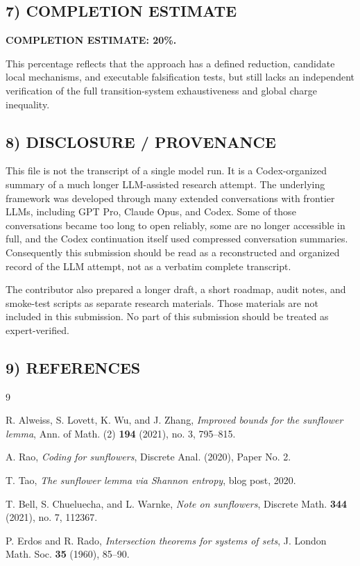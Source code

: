 \subsection{7) COMPLETION ESTIMATE}

\textbf{COMPLETION ESTIMATE: 20\%.}

This percentage reflects that the approach has a defined reduction, candidate
local mechanisms, and executable falsification tests, but still lacks an
independent verification of the full transition-system exhaustiveness and
global charge inequality.

\subsection{8) DISCLOSURE / PROVENANCE}

This file is not the transcript of a single model run.  It is a Codex-organized
summary of a much longer LLM-assisted research attempt.  The underlying
framework was developed through many extended conversations with frontier LLMs,
including GPT Pro, Claude Opus, and Codex.  Some of those conversations became
too long to open reliably, some are no longer accessible in full, and the Codex
continuation itself used compressed conversation summaries.  Consequently this
submission should be read as a reconstructed and organized record of the LLM
attempt, not as a verbatim complete transcript.

The contributor also prepared a longer draft, a short roadmap, audit notes,
and smoke-test scripts as separate research materials.  Those materials are
not included in this submission.  No part of this submission should be treated
as expert-verified.

\subsection{9) REFERENCES}

\begin{thebibliography}{9}

R. Alweiss, S. Lovett, K. Wu, and J. Zhang,
\emph{Improved bounds for the sunflower lemma},
Ann. of Math. (2) \textbf{194} (2021), no. 3, 795--815.

A. Rao,
\emph{Coding for sunflowers},
Discrete Anal. (2020), Paper No. 2.

T. Tao,
\emph{The sunflower lemma via Shannon entropy},
blog post, 2020.

T. Bell, S. Chueluecha, and L. Warnke,
\emph{Note on sunflowers},
Discrete Math. \textbf{344} (2021), no. 7, 112367.

P. Erdos and R. Rado,
\emph{Intersection theorems for systems of sets},
J. London Math. Soc. \textbf{35} (1960), 85--90.

\end{thebibliography}
